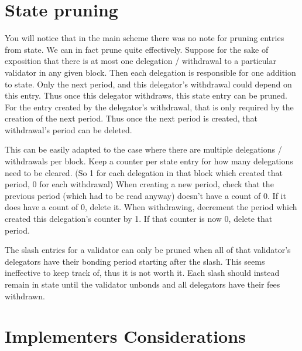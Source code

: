 \documentclass[]{article}
\begin{document}
\section{State pruning}
You will notice that in the main scheme there was no note for pruning entries from state.
We can in fact prune quite effectively.
Suppose for the sake of exposition that there is at most one delegation / withdrawal to a particular validator in any given block.
Then each delegation is responsible for one addition to state.
Only the next period, and this delegator's withdrawal could depend on this entry. Thus once this delegator withdraws, this state entry can be pruned.
For the entry created by the delegator's withdrawal, that is only required by the creation of the next period. Thus once the next period is created, that withdrawal's period can be deleted.

This can be easily adapted to the case where there are multiple delegations / withdrawals per block. Keep a counter per state entry for how many delegations need to be cleared. (So 1 for each delegation in that block which created that period, 0 for each withdrawal) When creating a new period, check that the previous period (which had to be read anyway) doesn't have a count of 0. If it does have a count of 0, delete it. When withdrawing, decrement the period which created this delegation's counter by 1. If that counter is now 0, delete that period.

The slash entries for a validator can only be pruned when all of that validator's delegators have their bonding period starting after the slash. This seems ineffective to keep track of, thus it is not worth it. Each slash should instead remain in state until the validator unbonds and all delegators have their fees withdrawn.

\section{Implementers Considerations}
\end{document}
